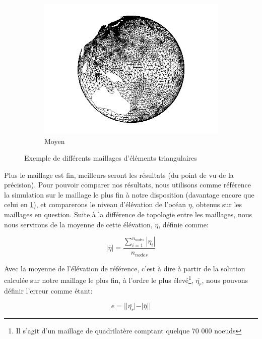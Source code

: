 \documentclass[a4paper,11pt]{article}
\begin{document}
\begin{figure}[H]
\begin{subfigure}[b]{0.3\textwidth}
                \centering
                \includegraphics[width=\textwidth]{TriMedium.png}
                \caption{Moyen}
                \label{fig:medium}
        \end{subfigure}
        \caption{Exemple de différents maillages d'éléments triangulaires}\label{fig:mesh}
\end{figure}

Plus le maillage est fin, meilleurs seront les résultats (du point de vu de la précision). Pour pouvoir comparer nos résultats, nous utilisons comme référence la simulation sur le maillage le plus fin à notre disposition (davantage encore que celui en \ref{fig:medium}), et comparerons le niveau d'élévation de l'océan $\eta$, obtenus sur les maillages en question. Suite à la différence de topologie entre les maillages, nous nous servirons de la moyenne de cette élévation, $\overline{\eta}$, définie comme:

\begin{equation}
|\overline{\eta}| = \dfrac{\sum\limits^{n_{nodes}}_{i=1} |\eta_i|}{n_{nodes}}
\end{equation}

Avec la moyenne de l'élévation de référence, c'est à dire à partir de la solution calculée sur notre maillage le plus fin, à l'ordre le plus élevé\footnote{Il s'agit d'un maillage de quadrilatère comptant quelque 70 000 noeuds}, $\overline{\eta_r}$, nous pouvons définir l'erreur comme étant:

\begin{equation}
e = ||\overline{\eta_r}|-|\overline{\eta}||
\end{equation}
\end{document}
